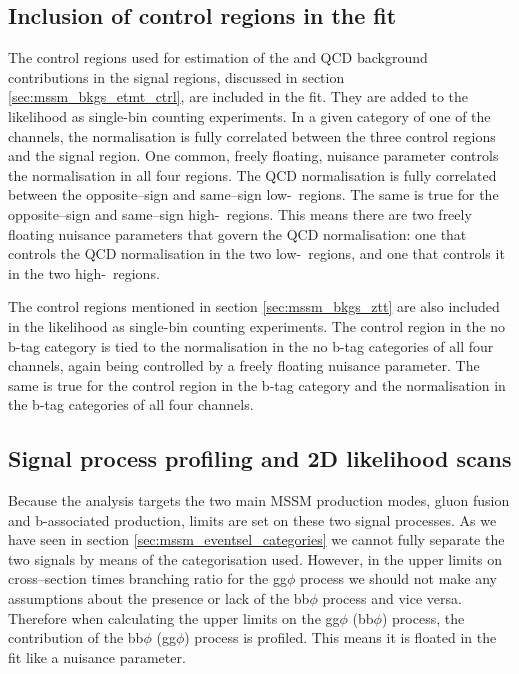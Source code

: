 \subsection{Inclusion of control regions in the fit}
\label{sec:mssm_sigext_ctrl}
The control regions used for estimation of the 
\Wjets and QCD background contributions in the signal regions, discussed
in section \ref{sec:mssm_bkgs_etmt_ctrl}, are included in the fit. They
are added to the likelihood as single-bin counting experiments. In a given
category of one of the channels, the \Wjets
normalisation is fully correlated between the three control 
regions and the signal region. One common, freely floating, nuisance parameter
controls the \Wjets normalisation in all four regions. The QCD normalisation
is fully correlated between the opposite--sign and same--sign low-\mT~regions. The
same is true for the opposite--sign and same--sign high-\mT~regions. This means there are
two freely floating nuisance parameters that govern the QCD normalisation: one
that controls the QCD normalisation in the two low-\mT~regions, and one
that controls it in the two high-\mT~regions.

The \Zmm control regions mentioned in section \ref{sec:mssm_bkgs_ztt}
are also included in the likelihood as single-bin counting experiments.
The \Zmm control region in the no b-tag category is tied
to the \Ztautau normalisation in the no b-tag categories of all four
channels, again being controlled by a freely floating nuisance parameter. 
The same is true for the \Zmm control region in the b-tag category
and the \Ztautau normalisation in the b-tag categories of all four channels.

\subsection{Signal process profiling and 2D likelihood scans}
\label{sec:mssm_sigext_profile}
Because the analysis targets the two main MSSM production modes, gluon fusion and
b-associated production, limits are set on these two signal processes. As we
have seen in section \ref{sec:mssm_eventsel_categories}  we cannot fully separate the two signals by means
of the categorisation used. 
However, in the upper limits on cross--section times branching ratio for the gg$\phi$
process we should not make any assumptions about the presence or lack of the bb$\phi$
process and vice versa. Therefore when calculating the upper limits on the gg$\phi$ (bb$\phi$)
process, the contribution of the bb$\phi$ (gg$\phi$) process is profiled. This means it is floated
in the fit like a nuisance parameter.

